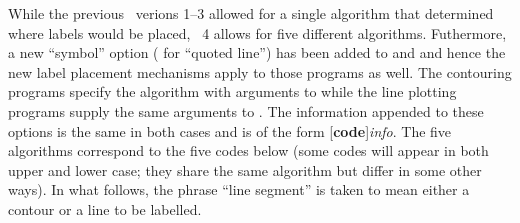 While the previous \GMT\ verions 1--3 allowed for a single algorithm that
determined where labels would be placed, \GMT\ 4 allows for five different
algorithms.  Futhermore, a new ``symbol'' option ( for ``quoted line'')
has been added to  and  and hence the new label
placement mechanisms apply to those programs as well.  The contouring programs
specify the algorithm with arguments to  while the line plotting
programs supply the same arguments to .  The information appended
to these options is the same in both cases and is of the form [{\bf code}]{\it info}.
The five algorithms correspond to the five codes below (some codes will appear in both
upper and lower case; they share the same algorithm but differ in some other ways).
In what follows, the phrase ``line segment'' is taken to mean either a contour or a line
to be labelled.

